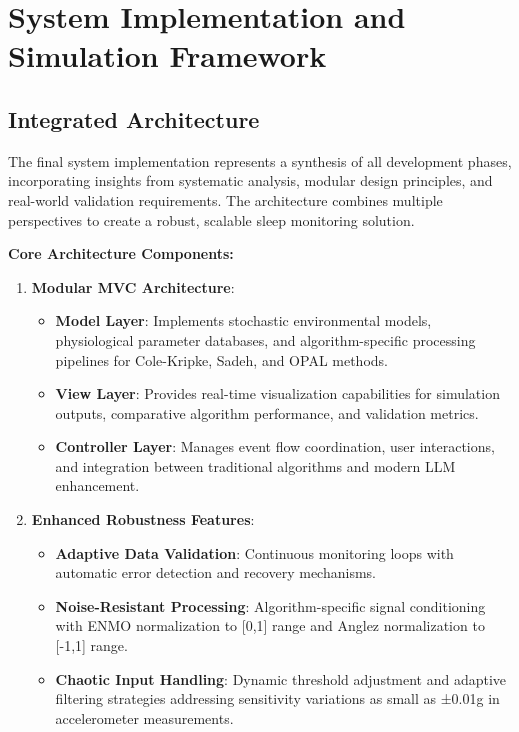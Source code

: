 \documentclass[conference]{IEEEtran}
\begin{document}
\section{System Implementation and Simulation Framework}
\subsection{Integrated Architecture}
The final system implementation represents a synthesis of all development phases, incorporating insights from systematic analysis, modular design principles, and real-world validation requirements. The architecture combines multiple perspectives to create a robust, scalable sleep monitoring solution.

\textbf{Core Architecture Components:}
\begin{enumerate}
    \item \textbf{Modular MVC Architecture}: 
    \begin{itemize}
        \item \textbf{Model Layer}: Implements stochastic environmental models, physiological parameter databases, and algorithm-specific processing pipelines for Cole-Kripke, Sadeh, and OPAL methods.
        \item \textbf{View Layer}: Provides real-time visualization capabilities for simulation outputs, comparative algorithm performance, and validation metrics.
        \item \textbf{Controller Layer}: Manages event flow coordination, user interactions, and integration between traditional algorithms and modern LLM enhancement.
    \end{itemize}
    
    \item \textbf{Enhanced Robustness Features}: 
    \begin{itemize}
        \item \textbf{Adaptive Data Validation}: Continuous monitoring loops with automatic error detection and recovery mechanisms.
        \item \textbf{Noise-Resistant Processing}: Algorithm-specific signal conditioning with ENMO normalization to [0,1] range and Anglez normalization to [-1,1] range.
        \item \textbf{Chaotic Input Handling}: Dynamic threshold adjustment and adaptive filtering strategies addressing sensitivity variations as small as ±0.01g in accelerometer measurements.
    \end{itemize}
\end{enumerate}
\end{document}

